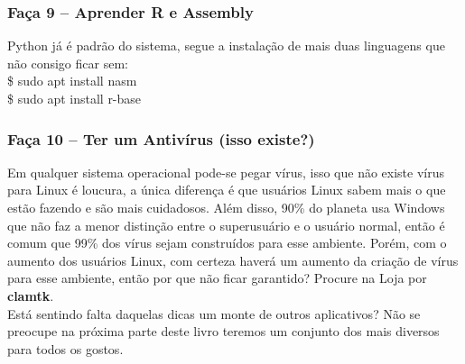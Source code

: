 \subsubsection{Faça 9 – Aprender R e Assembly}
Python já é padrão do sistema, segue a instalação de mais duas linguagens que não consigo ficar sem: \\
{\ttfamily\$ sudo apt install nasm \\
\$ sudo apt install r-base}

\subsubsection{Faça 10 – Ter um Antivírus (isso existe?)}
Em qualquer sistema operacional pode-se pegar vírus, isso que não existe vírus para  Linux é loucura, a única diferença é que usuários Linux sabem mais o que estão fazendo e são mais cuidadosos. Além disso, 90\% do planeta usa Windows que não faz a menor distinção entre o superusuário e o usuário normal, então é comum que 99\% dos vírus sejam construídos para esse ambiente. Porém, com o aumento dos usuários Linux, com certeza haverá um aumento da criação de vírus para esse ambiente, então por que não ficar garantido? Procure na Loja por \textbf{clamtk}. \\[3mm]
Está sentindo falta daquelas dicas um monte de outros aplicativos? Não se preocupe na próxima parte deste livro teremos um conjunto dos mais diversos para todos os gostos.

\clearpage